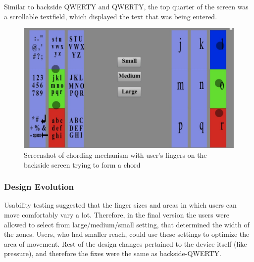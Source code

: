 Similar to backside QWERTY and QWERTY, the top quarter of the screen
was a scrollable textfield, which displayed the text that was being
entered.

\begin{figure}
    \includegraphics[scale=0.45]{Figures/chording.pdf} 
    \caption{Screenshot of chording mechanism with user's fingers on
      the backside screen trying to form a chord}
\end{figure} 
\subsubsection{Design Evolution}

Usability testing suggested that the finger sizes and areas in which
users can move comfortably vary a lot. Therefore, in the final version
the users were allowed to select from large/medium/small setting, that determined the width of the zones. Users, who had
smaller reach, could use these settings to optimize the area of
movement. Rest of the design changes pertained to the device itself (like pressure), and therefore the fixes were the same as backside-QWERTY.
